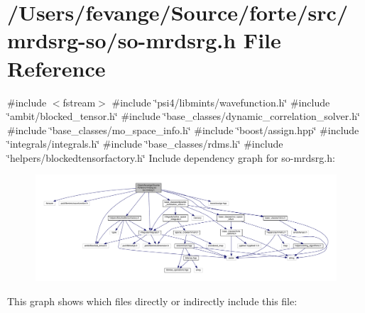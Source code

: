 \hypertarget{so-mrdsrg_8h}{}\section{/\+Users/fevange/\+Source/forte/src/mrdsrg-\/so/so-\/mrdsrg.h File Reference}
\label{so-mrdsrg_8h}
{\ttfamily \#include $<$fstream$>$}\newline
{\ttfamily \#include \char`\"{}psi4/libmints/wavefunction.\+h\char`\"{}}\newline
{\ttfamily \#include \char`\"{}ambit/blocked\+\_\+tensor.\+h\char`\"{}}\newline
{\ttfamily \#include \char`\"{}base\+\_\+classes/dynamic\+\_\+correlation\+\_\+solver.\+h\char`\"{}}\newline
{\ttfamily \#include \char`\"{}base\+\_\+classes/mo\+\_\+space\+\_\+info.\+h\char`\"{}}\newline
{\ttfamily \#include \char`\"{}boost/assign.\+hpp\char`\"{}}\newline
{\ttfamily \#include \char`\"{}integrals/integrals.\+h\char`\"{}}\newline
{\ttfamily \#include \char`\"{}base\+\_\+classes/rdms.\+h\char`\"{}}\newline
{\ttfamily \#include \char`\"{}helpers/blockedtensorfactory.\+h\char`\"{}}\newline
Include dependency graph for so-\/mrdsrg.h\+:
\nopagebreak
\begin{figure}[H]
\begin{center}
\leavevmode
\includegraphics[width=350pt]{so-mrdsrg_8h__incl}
\end{center}
\end{figure}
This graph shows which files directly or indirectly include this file\+:
\nopagebreak
